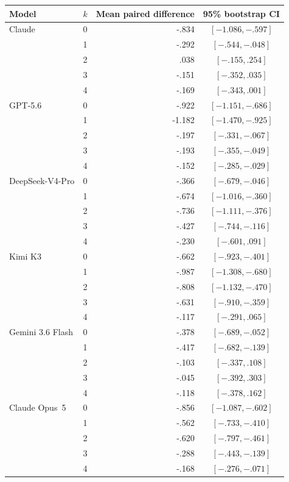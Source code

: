 \begin{center}
\begin{minipage}{\linewidth}
\centering
{}
\label{tab:coin-city-paired}
\small
\begin{tabular}{l c r c}
\toprule
Model & $k$ & Mean paired difference & 95\% bootstrap CI \\
\midrule
Claude & 0 & -.834 & $[-1.086,-.597]$ \\
       & 1 & -.292 & $[-.544,-.048]$ \\
       & 2 &  .038 & $[-.155, .254]$ \\
       & 3 & -.151 & $[-.352, .035]$ \\
       & 4 & -.169 & $[-.343, .001]$ \\
\midrule
GPT-5.6 & 0 & -.922 & $[-1.151,-.686]$ \\
        & 1 & -1.182 & $[-1.470,-.925]$ \\
        & 2 & -.197 & $[-.331,-.067]$ \\
        & 3 & -.193 & $[-.355,-.049]$ \\
        & 4 & -.152 & $[-.285,-.029]$ \\
\midrule
DeepSeek-V4-Pro & 0 & -.366 & $[-.679,-.046]$ \\
        & 1 & -.674 & $[-1.016,-.360]$ \\
        & 2 & -.736 & $[-1.111,-.376]$ \\
        & 3 & -.427 & $[-.744,-.116]$ \\
        & 4 & -.230 & $[-.601, .091]$ \\
\midrule
Kimi K3 & 0 & -.662 & $[-.923,-.401]$ \\
        & 1 & -.987 & $[-1.308,-.680]$ \\
        & 2 & -.808 & $[-1.132,-.470]$ \\
        & 3 & -.631 & $[-.910,-.359]$ \\
        & 4 & -.117 & $[-.291, .065]$ \\
\midrule
Gemini 3.6 Flash & 0 & -.378 & $[-.689,-.052]$ \\
                 & 1 & -.417 & $[-.682,-.139]$ \\
                 & 2 & -.103 & $[-.337,.108]$ \\
                 & 3 & -.045 & $[-.392,.303]$ \\
                 & 4 & -.118 & $[-.378,.162]$ \\
\midrule
Claude Opus~5 & 0 & -.856 & $[-1.087,-.602]$ \\
              & 1 & -.562 & $[-.733,-.410]$ \\
              & 2 & -.620 & $[-.797,-.461]$ \\
              & 3 & -.288 & $[-.443,-.139]$ \\
              & 4 & -.168 & $[-.276,-.071]$ \\
\bottomrule
\end{tabular}
\end{minipage}
\end{center}
\endgroup

